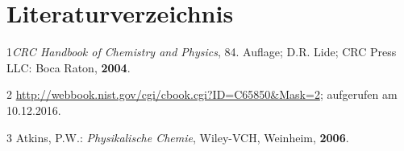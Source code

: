 \documentclass[12pt,a4paper,titlepage,headinclude,bibtotoc]{scrartcl}
\begin{document}
\FloatBarrier
\section{Literaturverzeichnis}

1\quad \emph{CRC Handbook of Chemistry and Physics}, 84. Auflage; D.R. Lide; CRC Press LLC: Boca Raton, \textbf{2004}.
\vspace{0,5 cm}


2 \quad \url{http://webbook.nist.gov/cgi/cbook.cgi?ID=C65850&Mask=2}; aufgerufen am 10.12.2016.\\
\vspace{0,5 cm}

3 \quad Atkins, P.W.: \emph{Physikalische Chemie}, Wiley-VCH, Weinheim, \textbf{2006}.\\











\end{document}

